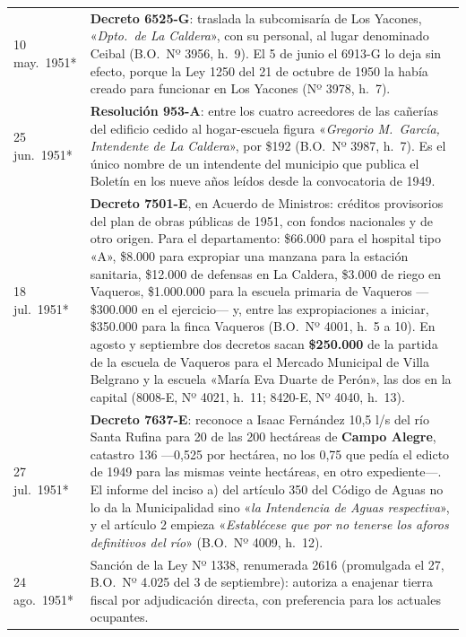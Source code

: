 \begin{longtable}{@{}p{2.7cm}p{10.3cm}@{}}
10 may.\ 1951* & \textbf{Decreto 6525-G}: traslada la subcomisaría de Los Yacones, «\textit{Dpto.\ de La Caldera}», con su personal, al lugar denominado Ceibal (B.O.\ Nº 3956, h.\ 9). El 5 de junio el 6913-G lo deja sin efecto, porque la Ley 1250 del 21 de octubre de 1950 la había creado para funcionar en Los Yacones (Nº 3978, h.\ 7). \\
25 jun.\ 1951* & \textbf{Resolución 953-A}: entre los cuatro acreedores de las cañerías del edificio cedido al hogar-escuela figura «\textit{Gregorio M.\ García, Intendente de La Caldera}», por \$192 (B.O.\ Nº 3987, h.\ 7). Es el único nombre de un intendente del municipio que publica el Boletín en los nueve años leídos desde la convocatoria de 1949. \\
18 jul.\ 1951* & \textbf{Decreto 7501-E}, en Acuerdo de Ministros: créditos provisorios del plan de obras públicas de 1951, con fondos nacionales y de otro origen. Para el departamento: \$66.000 para el hospital tipo «A», \$8.000 para expropiar una manzana para la estación sanitaria, \$12.000 de defensas en La Caldera, \$3.000 de riego en Vaqueros, \$1.000.000 para la escuela primaria de Vaqueros ---\$300.000 en el ejercicio--- y, entre las expropiaciones a iniciar, \$350.000 para la finca Vaqueros (B.O.\ Nº 4001, h.\ 5 a 10). En agosto y septiembre dos decretos sacan \textbf{\$250.000} de la partida de la escuela de Vaqueros para el Mercado Municipal de Villa Belgrano y la escuela «María Eva Duarte de Perón», las dos en la capital (8008-E, Nº 4021, h.\ 11; 8420-E, Nº 4040, h.\ 13). \\
27 jul.\ 1951* & \textbf{Decreto 7637-E}: reconoce a Isaac Fernández 10,5 l/s del río Santa Rufina para 20 de las 200 hectáreas de \textbf{Campo Alegre}, catastro 136 ---0,525 por hectárea, no los 0,75 que pedía el edicto de 1949 para las mismas veinte hectáreas, en otro expediente---. El informe del inciso a) del artículo 350 del Código de Aguas no lo da la Municipalidad sino «\textit{la Intendencia de Aguas respectiva}», y el artículo 2 empieza «\textit{Establécese que por no tenerse los aforos definitivos del río}» (B.O.\ Nº 4009, h.\ 12). \\
24 ago.\ 1951* & Sanción de la Ley Nº 1338, renumerada 2616 (promulgada el 27, B.O.\ Nº 4.025 del 3 de septiembre): autoriza a enajenar tierra fiscal por adjudicación directa, con preferencia para los actuales ocupantes. \\

\end{longtable}
